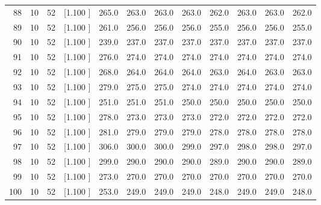 \documentclass[12pt,a4paper]{article}
\begin{document}
\begin{center}
{\begin{tabular}{r r r r r r r r r r r r}
  88& 10& 52&[1.100     ]&   265.0&   263.0&   263.0&   263.0&   262.0&   263.0&   263.0&   262.0\\[-0.02in]
  89& 10& 52&[1.100     ]&   261.0&   256.0&   256.0&   256.0&   255.0&   256.0&   256.0&   255.0\\[-0.02in]
  90& 10& 52&[1.100     ]&   239.0&   237.0&   237.0&   237.0&   237.0&   237.0&   237.0&   237.0\\[-0.02in]
  91& 10& 52&[1.100     ]&   276.0&   274.0&   274.0&   274.0&   274.0&   274.0&   274.0&   274.0\\[-0.02in]
  92& 10& 52&[1.100     ]&   268.0&   264.0&   264.0&   264.0&   263.0&   264.0&   263.0&   263.0\\[-0.02in]
  93& 10& 52&[1.100     ]&   279.0&   275.0&   275.0&   274.0&   274.0&   274.0&   274.0&   274.0\\[-0.02in]
  94& 10& 52&[1.100     ]&   251.0&   251.0&   251.0&   250.0&   250.0&   250.0&   250.0&   250.0\\[-0.02in]
  95& 10& 52&[1.100     ]&   278.0&   273.0&   273.0&   273.0&   272.0&   272.0&   272.0&   272.0\\[-0.02in]
  96& 10& 52&[1.100     ]&   281.0&   279.0&   279.0&   279.0&   278.0&   278.0&   278.0&   278.0\\[-0.02in]
  97& 10& 52&[1.100     ]&   306.0&   300.0&   300.0&   299.0&   297.0&   298.0&   298.0&   297.0\\[-0.02in]
  98& 10& 52&[1.100     ]&   299.0&   290.0&   290.0&   290.0&   289.0&   290.0&   290.0&   289.0\\[-0.02in]
  99& 10& 52&[1.100     ]&   273.0&   270.0&   270.0&   270.0&   270.0&   270.0&   270.0&   270.0\\[-0.02in]
 100& 10& 52&[1.100     ]&   253.0&   249.0&   249.0&   249.0&   248.0&   249.0&   249.0&   248.0\\[-0.02in]

\hline
\end{tabular}}
\end{center}
\end{document}
